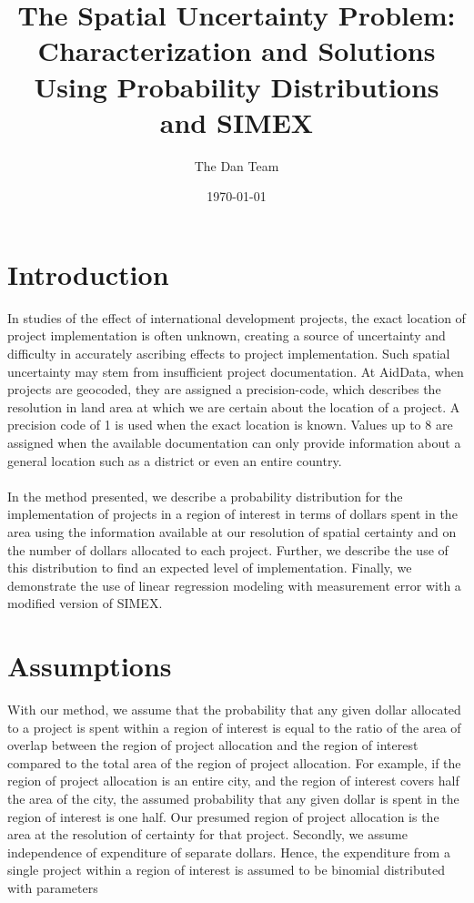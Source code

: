 \documentclass[12pt]{article}
\begin{document}
\title{The Spatial Uncertainty Problem:\\Characterization and Solutions Using Probability Distributions and SIMEX}
\author{The Dan Team}
\date{\today}
\maketitle

\setcounter{page}{0}
\thispagestyle{empty}

\doublespacing


\section{Introduction} \label{sec:introduction}

In studies of the effect of international development projects, the exact location of project implementation is often unknown, creating a source of uncertainty and difficulty in accurately ascribing effects to project implementation. Such spatial uncertainty may stem from insufficient project documentation. At AidData, when projects are geocoded, they are assigned a precision-code, which describes the resolution in land area at which we are certain about the location of a project. A precision code of 1 is used when the exact location is known. Values up to 8 are assigned when the available documentation can only provide information about a general location such as a district or even an entire country.
\\ \\
In the method presented, we describe a probability distribution for the implementation of projects in a region of interest in terms of dollars spent in the area using the information available at our resolution of spatial certainty and on the number of dollars allocated to each project. Further, we describe the use of this distribution to find an expected level of implementation. Finally, we demonstrate the use of linear regression modeling with measurement error with a modified version of SIMEX.

\section{Assumptions} \label{sec:assumptions}

With our method, we assume that the probability that any given dollar allocated to a project is spent within a region of interest is equal to the ratio of the area of overlap between the region of project allocation and the region of interest compared to the total area of the region of project allocation. For example, if the region of project allocation is an entire city, and the region of interest covers half the area of the city, the assumed probability that any given dollar is spent in the region of interest is one half. Our presumed region of project allocation is the area at the resolution of certainty for that project. Secondly, we assume independence of expenditure of separate dollars. Hence, the expenditure from a single project within a region of interest is assumed to be binomial distributed with parameters 
\end{document}
